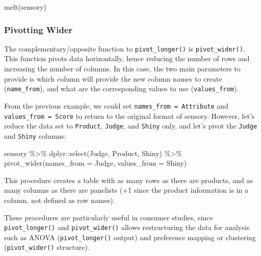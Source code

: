\documentclass[
]{book}
\newenvironment{Shaded}{\begin{snugshade}}{\end{snugshade}}
\newcommand{\AttributeTok}[1]{\textcolor[rgb]{0.77,0.63,0.00}{#1}}
\newcommand{\FunctionTok}[1]{\textcolor[rgb]{0.00,0.00,0.00}{#1}}
\newcommand{\NormalTok}[1]{#1}
\newcommand{\SpecialCharTok}[1]{\textcolor[rgb]{0.00,0.00,0.00}{#1}}
\begin{document}
\begin{Shaded}
\begin{Highlighting}[]
\FunctionTok{melt}\NormalTok{(sensory)}
\end{Highlighting}
\end{Shaded}

\hypertarget{pivotting-wider}{%
\subsubsection{Pivotting Wider}\label{pivotting-wider}}

The complementary/opposite function to \texttt{pivot\_longer()} is \texttt{pivot\_wider()}. This function pivots data horizontally, hence reducing the number of rows and increasing the number of columns. In this case, the two main parameters to provide is which column will provide the new column names to create (\texttt{name\_from}), and what are the corresponding values to use (\texttt{values\_from}).

From the previous example, we could set \texttt{names\_from\ =\ Attribute} and \texttt{values\_from\ =\ Score} to return to the original format of sensory. However, let's reduce the data set to \texttt{Product}, \texttt{Judge}, and \texttt{Shiny} only, and let's pivot the \texttt{Judge} and \texttt{Shiny} columns:

\begin{Shaded}
\begin{Highlighting}[]
\NormalTok{sensory }\SpecialCharTok{\%\textgreater{}\%} 
\NormalTok{  dplyr}\SpecialCharTok{::}\FunctionTok{select}\NormalTok{(Judge, Product, Shiny) }\SpecialCharTok{\%\textgreater{}\%} 
  \FunctionTok{pivot\_wider}\NormalTok{(}\AttributeTok{names\_from =}\NormalTok{ Judge, }\AttributeTok{values\_from =}\NormalTok{ Shiny)}
\end{Highlighting}
\end{Shaded}

This procedure creates a table with as many rows as there are products, and as many columns as there are panelists (+1 since the product information is in a column, not defined as row names).

These procedures are particularly useful in consumer studies, since \texttt{pivot\_longer()} and \texttt{pivot\_wider()} allows restructuring the data for analysis such as ANOVA (\texttt{pivot\_longer()} output) and preference mapping or clustering (\texttt{pivot\_wider()} structure).
\end{document}
